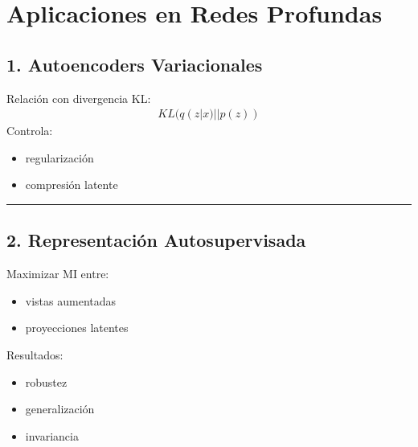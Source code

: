 \documentclass[letterpaper,10pt,english]{jupyterBook}
\begin{document}
\section{Aplicaciones en Redes Profundas}
\label{\detokenize{04_data_science_applications/deep_learning_mi:aplicaciones-en-redes-profundas}}

\subsection{1. Autoencoders Variacionales}
\label{\detokenize{04_data_science_applications/deep_learning_mi:autoencoders-variacionales}}
\sphinxAtStartPar
Relación con divergencia KL:
\begin{equation*}
\begin{split}
KL(q(z|x) || p(z))
\end{split}
\end{equation*}
\sphinxAtStartPar
Controla:
\begin{itemize}
\item {} 
\sphinxAtStartPar
regularización

\item {} 
\sphinxAtStartPar
compresión latente

\end{itemize}


\bigskip\hrule\bigskip



\subsection{2. Representación Auto\sphinxhyphen{}supervisada}
\label{\detokenize{04_data_science_applications/deep_learning_mi:representacion-auto-supervisada}}
\sphinxAtStartPar
Maximizar MI entre:
\begin{itemize}
\item {} 
\sphinxAtStartPar
vistas aumentadas

\item {} 
\sphinxAtStartPar
proyecciones latentes

\end{itemize}

\sphinxAtStartPar
Resultados:
\begin{itemize}
\item {} 
\sphinxAtStartPar
robustez

\item {} 
\sphinxAtStartPar
generalización

\item {} 
\sphinxAtStartPar
invariancia

\end{itemize}
\end{document}
